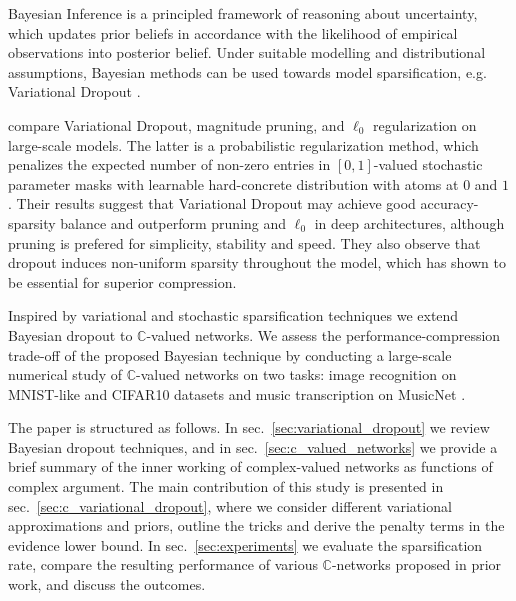 \documentclass[a4paper,10pt,onecolumn]{article}
\newcommand{\cplx}{\mathbb{C}}
\begin{document}
Bayesian Inference is a principled framework of reasoning about uncertainty, which updates
prior beliefs in accordance with the likelihood of empirical observations into posterior
belief. Under suitable modelling and distributional assumptions, Bayesian methods can be
used towards model sparsification, e.g. Variational Dropout \citep{kingma_variational_2015,molchanov_variational_2017}.

\citet{gale_state_2019} compare Variational Dropout, magnitude pruning, and $\ell_0$
regularization \citep{louizos_learning_2018} on large-scale models. The latter is a
probabilistic regularization method, which penalizes the expected number of non-zero
entries in $[0, 1]$-valued stochastic parameter masks with learnable hard-concrete
distribution with atoms at $0$ and $1$ \citep{maddison_concrete_2016,jang_categorical_2017}.
Their results suggest that Variational Dropout may achieve good accuracy-sparsity balance
and outperform pruning and $\ell_0$ in deep architectures, although pruning is prefered for
simplicity, stability and speed. They also observe that dropout induces non-uniform sparsity
throughout the model, which \citet{he_amc:_2018} has shown to be essential for superior
compression.
%
%

Inspired by variational and stochastic sparsification techniques we extend Bayesian dropout
to $\cplx$-valued networks. We assess the performance-compression trade-off of the proposed
Bayesian technique by conducting a large-scale numerical study of $\cplx$-valued networks
on two tasks: image recognition on MNIST-like and CIFAR10 datasets and music transcription
on MusicNet \citep{thickstun_learning_2017}.

The paper is structured as follows. In sec.~\ref{sec:variational_dropout} we review Bayesian
dropout techniques, and in sec.~\ref{sec:c_valued_networks} we provide a brief summary of
the inner working of complex-valued networks as functions of complex argument. The main
contribution of this study is presented in sec.~\ref{sec:c_variational_dropout},
where we consider different variational approximations and priors, outline the tricks
and derive the penalty terms in the evidence lower bound. In sec.~\ref{sec:experiments}
we evaluate the sparsification rate, compare the resulting performance of various $\cplx$-networks
proposed in prior work, and discuss the outcomes.
\end{document}
